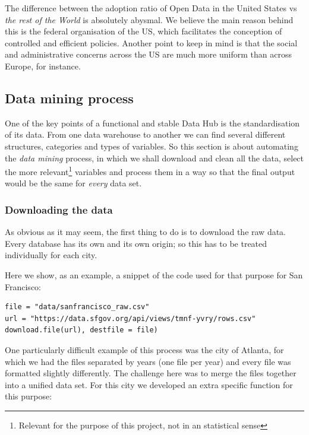 The difference between the adoption ratio of Open Data in the United States vs \emph{the rest of the World} is absolutely abysmal. We believe the main reason behind this is the federal organisation of the US, which facilitates the conception of controlled and efficient policies. Another point to keep in mind is that the social and administrative concerns across the US are much more uniform than across Europe, for instance.

\subsection{Data mining process}\label{sec:data-mining}

One of the key points of a functional and stable Data Hub is the standardisation of its data. From one data warehouse to another we can find several different structures, categories and types of variables. So this section is about automating the \emph{data mining} process, in which we shall download and clean all the data, select the more relevant\footnote{Relevant for the purpose of this project, not in an statistical sense} variables and process them in a way so that the final output would be the same for \emph{every} data set.

\subsubsection*{Downloading the data}

As obvious as it may seem, the first thing to do is to download the raw data. Every database has its own  and its own origin; so this has to be treated individually for each city.

Here we show, as an example, a snippet of the code used for that purpose for San Francisco:
\begin{lstlisting}
file = "data/sanfrancisco_raw.csv"
url = "https://data.sfgov.org/api/views/tmnf-yvry/rows.csv"
download.file(url), destfile = file)
\end{lstlisting}

One particularly difficult example of this process was the city of Atlanta, for which we had the files separated by years (one file per year) and every file was formatted slightly differently. The challenge here was to merge the files together into a unified data set. For this city we developed an extra specific function for this purpose: 

